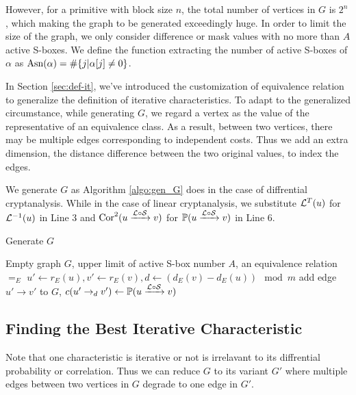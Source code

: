 However, for a primitive with block size $n$, the total number of vertices in $G$ is $2^n$, which making the graph to be generated exceedingly huge. In order to limit the size of the graph, we only consider difference or mask values with no more than $A$ active S-boxes. We define the function extracting the number of active S-boxes of $\alpha$ as $\text{Asn}(\alpha)=\#\{j|\alpha[j]\neq 0\}$. 

In Section \ref{sec:def-it}, we've introduced the customization of equivalence relation to generalize the definition of iterative characteristics. To adapt to the generalized circumstance, while generating $G$, we regard a vertex as the value of the representative of an equivalence class. As a result, between two vertices, there may be multiple edges corresponding to independent costs. Thus we add an extra dimension, the distance difference between the two original values, to index the edges. 

We generate $G$ as Algorithm \ref{algo:gen_G} does in the case of diffrential cryptanalysis. While in the case of linear cryptanalysis, we substitute $\mathcal{L}^{T}(u)$ for $\mathcal{L}^{-1}(u)$ in Line 3 and $\text{Cor}^2(u\xrightarrow{\mathcal{L}\circ\mathcal{S}}v)$ for $\mathbb{P}(u\xrightarrow{\mathcal{L}\circ\mathcal{S}}v)$ in Line 6. 

\begin{algorithm}
	\caption{Generate $G$}
	\label{algo:gen_G}
	\begin{algorithmic}[1]
		\Require Empty graph $G$, upper limit of active S-box number $A$, an equivalence relation $=_E$
		\Procedure {}{}
		\State $u'\leftarrow r_E(u),v'\leftarrow r_E(v),d\leftarrow (d_E(v)-d_E(u))\mod m$
		\State add edge $u'\rightarrow v'$ to $G$, $c(u'\rightarrow_d v')\leftarrow \mathbb{P}(u\xrightarrow{\mathcal{L}\circ\mathcal{S}}v)$
		\EndFor
		\EndIf
		\EndFor
		\EndProcedure
	\end{algorithmic}
\end{algorithm}

\subsection{Finding the Best Iterative Characteristic}\label{sec:find_ite_c}

Note that one characteristic is iterative or not is irrelavant to its diffrential probability or correlation. Thus we can reduce $G$ to its variant $G'$ where multiple edges between two vertices in $G$ degrade to one edge in $G'$. 

